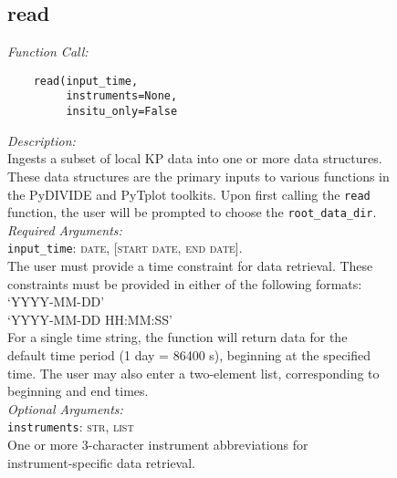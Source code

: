 \documentclass{article}
\begin{document}
\subsection{read}
\label{subsec:read}
\vspace{-5mm}
\textit{Function Call:}\\
\vspace{-10mm}
\begin{verbatim}
    read(input_time,
         instruments=None, 
         insitu_only=False
\end{verbatim}
\vspace{-5mm}
\noindent
\textit{Description:}\\
\indent Ingests a subset of local KP data into one or more data structures.\\
\indent These data structures are the primary inputs to various functions in\\
\indent the PyDIVIDE and PyTplot toolkits. Upon first calling the \texttt{read}\\
\indent function, the user will be prompted to choose the \texttt{root\_data\_dir}.\\
\textit{Required Arguments:}\\
\indent \texttt{input\_time}: \textsc{date, [start date, end date]}.\\
\indent \indent The user must provide a time constraint for data retrieval. These\\
\indent \indent constraints must be provided in either of the following formats:\\
\indent \indent \indent `YYYY-MM-DD'\\
\indent \indent \indent `YYYY-MM-DD HH:MM:SS'\\
\indent \indent For a single time string, the function will return data for the \\
\indent \indent default time period (1 day = 86400 s), beginning at the specified\\
\indent \indent time. The user may also enter a two-element list, corresponding to\\
\indent \indent beginning and end times.\\
\noindent \textit{Optional Arguments:}\\
\indent \texttt{instruments}: \textsc{str, list}\\
\indent \indent One or more 3-character instrument abbreviations for \\
\indent \indent instrument-specific data retrieval.\\
\end{document}
